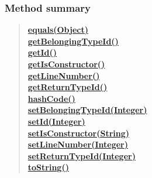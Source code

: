 {{\subsubsection{Method summary}{
\begin{verse}
\hyperlink{it.unisa.sesa.repominer.db.entities.Method.equals(java.lang.Object)}{{\bf equals(Object)}} \\
\hyperlink{it.unisa.sesa.repominer.db.entities.Method.getBelongingTypeId()}{{\bf getBelongingTypeId()}} \\
\hyperlink{it.unisa.sesa.repominer.db.entities.Method.getId()}{{\bf getId()}} \\
\hyperlink{it.unisa.sesa.repominer.db.entities.Method.getIsConstructor()}{{\bf getIsConstructor()}} \\
\hyperlink{it.unisa.sesa.repominer.db.entities.Method.getLineNumber()}{{\bf getLineNumber()}} \\
\hyperlink{it.unisa.sesa.repominer.db.entities.Method.getReturnTypeId()}{{\bf getReturnTypeId()}} \\
\hyperlink{it.unisa.sesa.repominer.db.entities.Method.hashCode()}{{\bf hashCode()}} \\
\hyperlink{it.unisa.sesa.repominer.db.entities.Method.setBelongingTypeId(java.lang.Integer)}{{\bf setBelongingTypeId(Integer)}} \\
\hyperlink{it.unisa.sesa.repominer.db.entities.Method.setId(java.lang.Integer)}{{\bf setId(Integer)}} \\
\hyperlink{it.unisa.sesa.repominer.db.entities.Method.setIsConstructor(java.lang.String)}{{\bf setIsConstructor(String)}} \\
\hyperlink{it.unisa.sesa.repominer.db.entities.Method.setLineNumber(java.lang.Integer)}{{\bf setLineNumber(Integer)}} \\
\hyperlink{it.unisa.sesa.repominer.db.entities.Method.setReturnTypeId(java.lang.Integer)}{{\bf setReturnTypeId(Integer)}} \\
\hyperlink{it.unisa.sesa.repominer.db.entities.Method.toString()}{{\bf toString()}} \\
\end{verse}
}
}}
